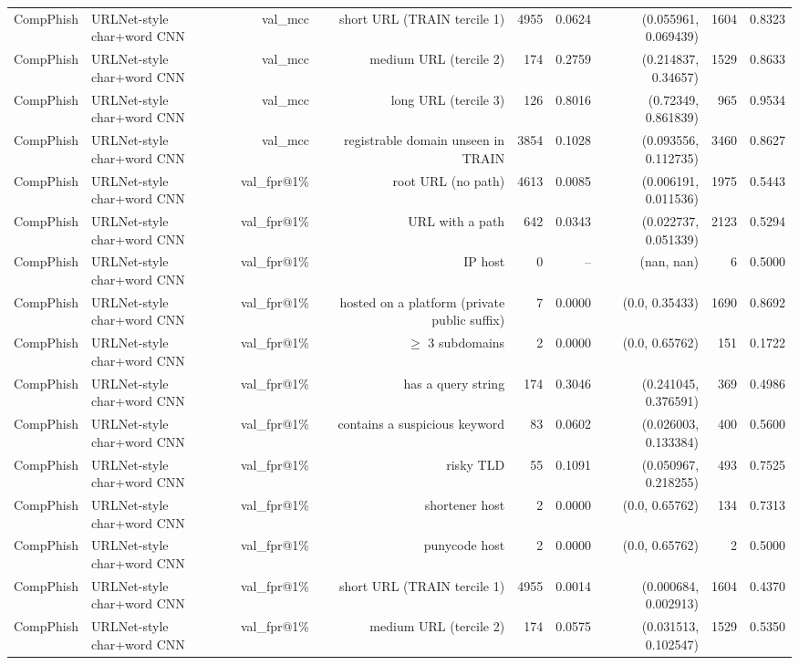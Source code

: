\begin{table}[t]
\begin{tabular}{llrrrrrrr}
CompPhish & URLNet-style char+word CNN & val\_mcc & short URL (TRAIN tercile 1) & 4955 & 0.0624 & (0.055961, 0.069439) & 1604 & 0.8323 \\
CompPhish & URLNet-style char+word CNN & val\_mcc & medium URL (tercile 2) & 174 & 0.2759 & (0.214837, 0.34657) & 1529 & 0.8633 \\
CompPhish & URLNet-style char+word CNN & val\_mcc & long URL (tercile 3) & 126 & 0.8016 & (0.72349, 0.861839) & 965 & 0.9534 \\
CompPhish & URLNet-style char+word CNN & val\_mcc & registrable domain unseen in TRAIN & 3854 & 0.1028 & (0.093556, 0.112735) & 3460 & 0.8627 \\
CompPhish & URLNet-style char+word CNN & val\_fpr@1\% & root URL (no path) & 4613 & 0.0085 & (0.006191, 0.011536) & 1975 & 0.5443 \\
CompPhish & URLNet-style char+word CNN & val\_fpr@1\% & URL with a path & 642 & 0.0343 & (0.022737, 0.051339) & 2123 & 0.5294 \\
CompPhish & URLNet-style char+word CNN & val\_fpr@1\% & IP host & 0 & -- & (nan, nan) & 6 & 0.5000 \\
CompPhish & URLNet-style char+word CNN & val\_fpr@1\% & hosted on a platform (private public suffix) & 7 & 0.0000 & (0.0, 0.35433) & 1690 & 0.8692 \\
CompPhish & URLNet-style char+word CNN & val\_fpr@1\% & $\geq$ 3 subdomains & 2 & 0.0000 & (0.0, 0.65762) & 151 & 0.1722 \\
CompPhish & URLNet-style char+word CNN & val\_fpr@1\% & has a query string & 174 & 0.3046 & (0.241045, 0.376591) & 369 & 0.4986 \\
CompPhish & URLNet-style char+word CNN & val\_fpr@1\% & contains a suspicious keyword & 83 & 0.0602 & (0.026003, 0.133384) & 400 & 0.5600 \\
CompPhish & URLNet-style char+word CNN & val\_fpr@1\% & risky TLD & 55 & 0.1091 & (0.050967, 0.218255) & 493 & 0.7525 \\
CompPhish & URLNet-style char+word CNN & val\_fpr@1\% & shortener host & 2 & 0.0000 & (0.0, 0.65762) & 134 & 0.7313 \\
CompPhish & URLNet-style char+word CNN & val\_fpr@1\% & punycode host & 2 & 0.0000 & (0.0, 0.65762) & 2 & 0.5000 \\
CompPhish & URLNet-style char+word CNN & val\_fpr@1\% & short URL (TRAIN tercile 1) & 4955 & 0.0014 & (0.000684, 0.002913) & 1604 & 0.4370 \\
CompPhish & URLNet-style char+word CNN & val\_fpr@1\% & medium URL (tercile 2) & 174 & 0.0575 & (0.031513, 0.102547) & 1529 & 0.5350 \\

\end{tabular}
\end{table}
